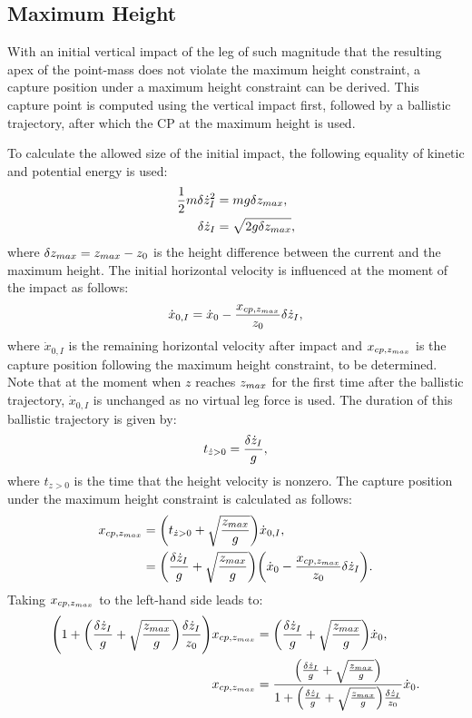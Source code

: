 \subsection{Maximum Height}
With an initial vertical impact of the leg of such magnitude that the resulting apex of the point-mass does not violate the maximum height constraint, a capture position under a maximum height constraint can be derived. This capture point is computed using the vertical impact first, followed by a ballistic trajectory, after which the \ac{CP} at the maximum height is used.

To calculate the allowed size of the initial impact, the following equality of kinetic and potential energy is used:
\begin{align}
 	\frac{1}{2}m\delta \dot{z}_I^2 &= mg\delta z_{max},\\
 	\delta \dot{z}_I &= \sqrt{2g\delta z_{max}}, 
\end{align}
where $\delta z_{max}=z_{max}-z_0$ is the height difference between the current and the maximum height. The initial horizontal velocity is influenced at the moment of the impact as follows:
\begin{equation}\label{eq:dotximpact}
	\dot{x}_{0,I} = \dot{x}_0-\frac{x_{cp,z_{max}}}{z_0}\delta \dot{z}_I,
\end{equation}
where $\dot{x}_{0,I}$ is the remaining horizontal velocity after impact and $x_{cp,z_{max}}$ is the capture position following the maximum height constraint, to be determined. Note that at the moment when $z$ reaches $z_{max}$ for the first time after the ballistic trajectory, $\dot{x}_{0,I}$ is unchanged as no virtual leg force is used. The duration of this ballistic trajectory is given by:
\begin{equation}
	t_{\dot{z}>0} =\frac{\delta \dot{z}_I}{g},
\end{equation}
where $t_{\dot{z}>0}$ is the time that the height velocity is nonzero. The capture position under the maximum height constraint is calculated as follows:
\begin{align}
	x_{cp,z_{max}}&=\bigg(t_{\dot{z}>0}+\sqrt{\frac{z_{max}}{g}}\bigg)\dot{x}_{0,I},\\
			&=\bigg(\frac{\delta \dot{z}_I}{g}+\sqrt{\frac{z_{max}}{g}}\bigg)\bigg(\dot{x}_0-\frac{x_{cp,z_{max}}}{z_0}\delta \dot{z}_I\bigg).
\end{align}
Taking $x_{cp,z_{max}}$ to the left-hand side leads to:
\begin{align}
	 \Bigg(1+\bigg(\frac{\delta \dot{z}_I}{g}+\sqrt{\frac{z_{max}}{g}}\bigg)\frac{\delta \dot{z}_I}{z_0}\Bigg)x_{cp,z_{max}}& =		\bigg(\frac{\delta \dot{z}_I}{g}+\sqrt{\frac{z_{max}}{g}}\bigg)\dot{x}_0,\\
	 x_{cp,z_{max}} & = \frac{\Big(\frac{\delta \dot{z}_I}{g}+\sqrt{\frac{z_{max}}{g}}\Big)}{ 1+\Big(\frac{\delta \dot{z}_I}{g}+\sqrt{\frac{z_{max}}{g}}\Big)\frac{\delta \dot{z}_I}{z_0}}\dot{x}_0.
\end{align}
